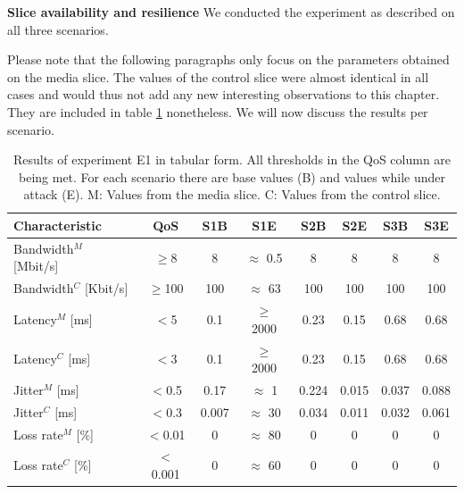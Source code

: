 \begin{description}[style=multiline, labelwidth=0.7cm]
    \item[\ref{E1}] \textbf{Slice availability and resilience} We conducted the experiment as described on all three scenarios.

    Please note that the following paragraphs only focus on the parameters obtained on the media slice. The values of the control slice were almost identical in all cases and would thus not add any new interesting observations to this chapter. They are included in table \ref{table:validation_qos_results} nonetheless. We will now discuss the results per scenario.

    \begin{table}[ht]
        \centering
        \begin{tabular}{|l|c|c|c|c|c|c|c|}
             \hline
             \textbf{Characteristic} & \textbf{QoS} & \textbf{S1B} & \textbf{S1E} & \textbf{S2B} & \textbf{S2E} & \textbf{S3B} & \textbf{S3E} \\
             \hline
             Bandwidth$^M$ [Mbit/s] & $\geq$8 & 8 & $\approx$ 0.5 & 8 & 8 & 8 & 8 \\
             Bandwidth$^C$ [Kbit/s] & $\geq$100 & 100 & $\approx$ 63 & 100 & 100 & 100 & 100 \\
             \hline
             Latency$^M$ [ms] & $<$5 & 0.1 & $\geq$ 2000 & 0.23 & 0.15 & 0.68 & 0.68 \\
             Latency$^C$ [ms] & $<$3 & 0.1 & $\geq$ 2000 & 0.23 & 0.15 & 0.68 & 0.68 \\
             \hline
             Jitter$^M$ [ms] & $<$0.5 & 0.17 & $\approx$ 1 & 0.224 & 0.015 & 0.037 & 0.088 \\
             Jitter$^C$ [ms] & $<$0.3 & 0.007 & $\approx$ 30 & 0.034 & 0.011 & 0.032 & 0.061 \\
             \hline
             Loss rate$^M$ [\%] & $<$0.01 & 0 & $\approx$ 80 & 0 & 0 & 0 & 0 \\
             Loss rate$^C$ [\%] & $<$0.001 & 0 & $\approx$ 60 & 0 & 0 & 0 & 0 \\
             \hline
        \end{tabular}
        \caption[Results of experiment E1]{Results of experiment E1 in tabular form. All thresholds in the QoS column are being met. For each scenario there are base values (B) and values while under attack (E). M: Values from the media slice. C: Values from the control slice.}
        \label{table:validation_qos_results}
    \end{table}


\end{description}
